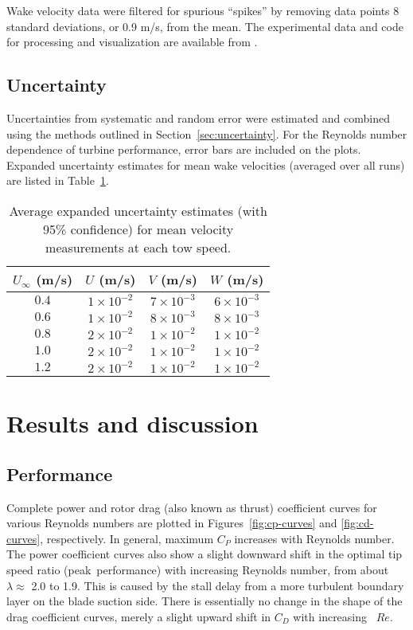 Wake velocity data were filtered for spurious ``spikes'' by removing data points
8 standard deviations, or 0.9 m/s, from the mean. The experimental data and code
for processing and visualization are available from
\cite{Bachant2016-RVAT-Re-dep}.


\subsection{Uncertainty}

Uncertainties from systematic and random error were estimated and combined using
the methods outlined in Section~\ref{sec:uncertainty}. For the Reynolds number
dependence of turbine performance, error bars are included on the plots.
Expanded uncertainty estimates for mean wake velocities (averaged over all runs)
are listed in Table~\ref{tab:vel-unc}.

\begin{table}[ht]
\centering
\begin{tabular}{c|c|c|c}
    $U_\infty$ (m/s) &   $U$ (m/s) &  $V$ (m/s) &  $W$ (m/s) \\
    \hline
    $0.4$ & $1 \times 10^{-2}$ & $7 \times 10^{-3}$ & $6 \times 10^{-3}$ \\
    $0.6$ & $1 \times 10^{-2}$ & $8 \times 10^{-3}$ & $8 \times 10^{-3}$ \\
    $0.8$ & $2 \times 10^{-2}$ & $1 \times 10^{-2}$ & $1 \times 10^{-2}$ \\
    $1.0$ & $2 \times 10^{-2}$ & $1 \times 10^{-2}$ & $1 \times 10^{-2}$ \\
    $1.2$ & $2 \times 10^{-2}$ & $1 \times 10^{-2}$ & $1 \times 10^{-2}$ \\
\end{tabular}
\caption{Average expanded uncertainty estimates (with 95\% confidence) for mean
    velocity measurements at each tow speed.}

\label{tab:vel-unc}
\end{table}


\section{Results and discussion}

\subsection{Performance}

Complete power and rotor drag (also known as thrust) coefficient curves for
various Reynolds numbers are plotted in Figures~\ref{fig:cp-curves} and
\ref{fig:cd-curves}, respectively. In general, maximum $C_P$ increases with
Reynolds number. The power coefficient curves also show a slight downward shift
in the optimal tip speed ratio (peak~performance) with increasing Reynolds
number, from about $\lambda \approx$ 2.0 to 1.9. This is caused by the stall
delay from a more turbulent boundary layer on the blade suction side. There is
essentially no change in the shape of the drag coefficient curves, merely a
slight upward shift in $C_D$ with increasing~ $Re$.

